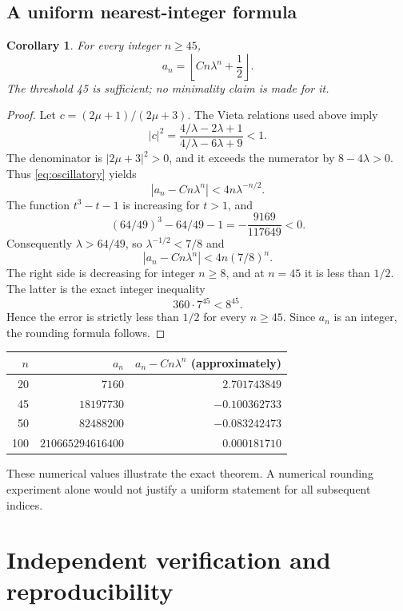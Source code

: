 \documentclass[11pt,letterpaper]{article}
\numberwithin{equation}{section}
\newtheorem{corollary}[theorem]{Corollary}
\theoremstyle{definition}
\theoremstyle{remark}
\begin{document}
\subsection{A uniform nearest-integer formula}

\begin{corollary}\label{cor:rounding}
For every integer $n\ge45$,
\begin{equation}\label{eq:rounding}
 \boxed{\displaystyle a_n=\left\lfloor Cn\lambda^n+\frac12\right\rfloor.}
\end{equation}
The threshold 45 is sufficient; no minimality claim is made for it.
\end{corollary}
\begin{proof}
Let $c=(2\mu+1)/(2\mu+3)$. The Vieta relations used above imply
\[
 |c|^2=
 \frac{4/\lambda-2\lambda+1}{4/\lambda-6\lambda+9}<1.
\]
The denominator is $|2\mu+3|^2>0$, and it exceeds the numerator
by $8-4\lambda>0$. Thus \eqref{eq:oscillatory} yields
\[
 |a_n-Cn\lambda^n|<4n\lambda^{-n/2}.
\]
The function $t^3-t-1$ is increasing for $t>1$, and
\[
 (64/49)^3-64/49-1=-\frac{9169}{117649}<0.
\]
Consequently $\lambda>64/49$, so $\lambda^{-1/2}<7/8$ and
\[
 |a_n-Cn\lambda^n|<4n(7/8)^n.
\]
The right side is decreasing for integer $n\ge8$, and at $n=45$
it is less than $1/2$. The latter is the exact integer inequality
\[
 360\cdot7^{45}<8^{45}.
\]
Hence the error is strictly less than $1/2$ for every $n\ge45$.
Since $a_n$ is an integer, the rounding formula follows.
\end{proof}

\begin{center}
\begin{tabular}{r r r}
\toprule
$n$ & $a_n$ & $a_n-Cn\lambda^n$ (approximately)\\
\midrule
20 & $7160$ & $2.701743849$\\
45 & $18197730$ & $-0.100362733$\\
50 & $82488200$ & $-0.083242473$\\
100 & $210665294616400$ & $0.000181710$\\
\bottomrule
\end{tabular}
\end{center}
These numerical values illustrate the exact theorem. A numerical
rounding experiment alone would not justify a uniform statement
for all subsequent indices.

\section{Independent verification and reproducibility}\label{sec:verification}
\end{document}
